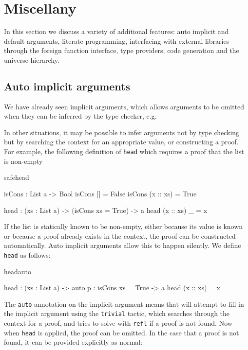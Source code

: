 \section{Miscellany}

In this section we discuss a variety of additional features:
auto implicit and default 
arguments, literate programming, interfacing with external libraries through the
foreign function interface, type providers, code generation and the universe hierarchy.

\subsection{Auto implicit arguments}

We have already seen implicit arguments, which allows arguments to be omitted when
they can be inferred by the type checker, e.g.


\noindent
In other situations, it may be possible to infer arguments not by type checking but
by searching the context for an appropriate value, or constructing a proof. For example,
the following definition of \texttt{head} which requires a proof that the list is
non-empty

\begin{SaveVerbatim}{safehead}

isCons : List a -> Bool
isCons [] = False
isCons (x :: xs) = True

head : (xs : List a) -> (isCons xs = True) -> a
head (x :: xs) _ = x

\end{SaveVerbatim}

\noindent
If the list is statically known to be non-empty, either because its value is known or
because a proof already exists in the context, the proof can be constructed
automatically. Auto implicit arguments allow this to happen silently. We define
\texttt{head} as follows:

\begin{SaveVerbatim}{headauto}

head : (xs : List a) -> {auto p : isCons xs = True} -> a
head (x :: xs) = x

\end{SaveVerbatim}

\noindent
The \texttt{auto} annotation on the implicit argument means that \Idris{} will
attempt to fill in the implicit argument using the \texttt{trivial} tactic, which
searches through the context for a proof, and tries to solve with \texttt{refl}
if a proof is not found.
Now when \texttt{head} is applied, the proof can be omitted. In the case that a proof
is not found, it can be provided explicitly as normal:

